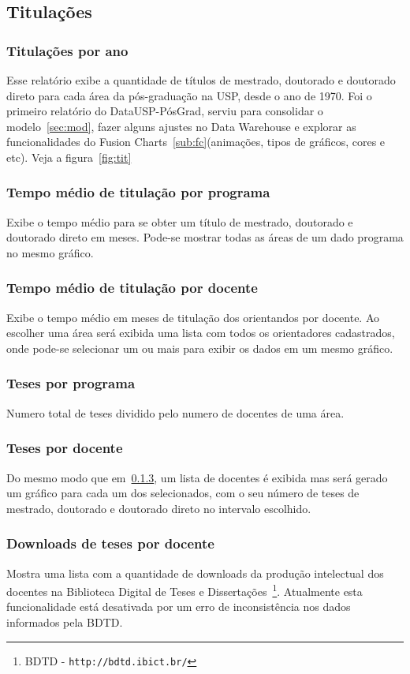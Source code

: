 \subsection{Titulações}
\subsubsection{Titulações por ano}
\label{subsub:titano}
Esse relatório exibe a quantidade de títulos de mestrado, doutorado e doutorado direto para cada área
da pós-graduação na USP, desde o ano de 1970. Foi o primeiro relatório do DataUSP-PósGrad, serviu para consolidar o modelo~\ref{sec:mod}, fazer alguns ajustes no Data Warehouse e explorar as funcionalidades do Fusion Charts~\ref{sub:fc}(animações, tipos de gráficos, cores e etc). Veja a figura~\ref{fig:tit}  

\subsubsection{Tempo médio de titulação por programa}
Exibe o tempo médio para se obter um título de mestrado, doutorado e doutorado direto em meses. Pode-se mostrar todas as áreas de um dado programa no mesmo gráfico.

\subsubsection{Tempo médio de titulação por docente}
\label{ssc:td}
Exibe o tempo médio em meses de titulação dos orientandos por docente. Ao escolher uma área será exibida uma lista com todos os orientadores cadastrados, onde pode-se selecionar um ou mais para exibir os dados em um mesmo gráfico.

\subsubsection{Teses por programa}
Numero total de teses dividido pelo numero de docentes de uma área.

\subsubsection{Teses por docente}
Do mesmo modo que em~\ref{ssc:td}, um lista de docentes é exibida mas será gerado um gráfico para cada um dos selecionados, com o seu número de teses de mestrado, doutorado e doutorado direto no intervalo escolhido.

\subsubsection{Downloads de teses por docente}
Mostra uma lista com a quantidade de downloads da produção intelectual dos docentes na Biblioteca Digital de Teses e Dissertações~\footnote{BDTD - \texttt{http://bdtd.ibict.br/}}. Atualmente esta funcionalidade está desativada por um erro de inconsistência nos dados informados pela BDTD.

